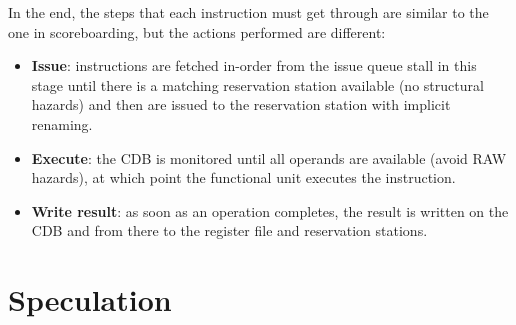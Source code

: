 In the end, the steps that each instruction must get through are similar to the one in scoreboarding, but the actions performed are different:
\begin{itemize}
  \item \textbf{Issue}: instructions are fetched in-order from the issue queue stall in this stage until there is a matching reservation station available (no structural hazards) and then are issued to the reservation station with implicit renaming.
  \item \textbf{Execute}: the \ac{CDB} is monitored until all operands are available (avoid \ac{RAW} hazards), at which point the functional unit executes the instruction.
  \item \textbf{Write result}: as soon as an operation completes, the result is written on the \ac{CDB} and from there to the register file and reservation stations.
\end{itemize}

\section{Speculation}

